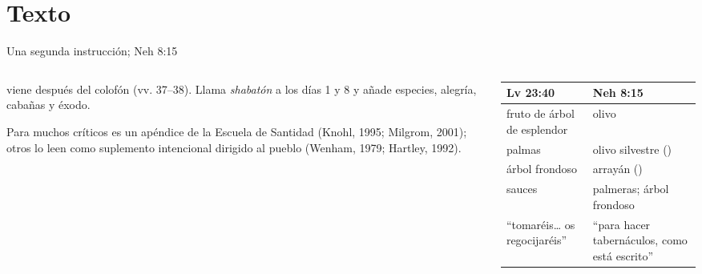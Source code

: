 \section{Texto}

\begin{frame}{Una segunda instrucción; Neh 8:15}
\begin{columns}[t,onlytextwidth]
\begin{column}{0.47\textwidth}\scriptsize
{} viene después del colofón (vv. 37--38). Llama \emph{shabatón} a los días 1 y 8 y añade especies, alegría, cabañas y éxodo.\par\smallskip
Para muchos críticos es un apéndice de la Escuela de Santidad (Knohl, 1995; Milgrom, 2001); otros lo leen como suplemento intencional dirigido al pueblo (Wenham, 1979; Hartley, 1992).
\end{column}
\begin{column}{0.51\textwidth}\scriptsize\renewcommand{\arraystretch}{1.12}
\begin{tabular}{@{}L{2.6cm}L{2.9cm}@{}}
\toprule
\textbf{Lv 23:40} & \textbf{Neh 8:15} \\ \midrule
fruto de árbol de esplendor & olivo \\
palmas & olivo silvestre () \\
árbol frondoso & arrayán () \\
sauces & palmeras; árbol frondoso \\ \midrule
``tomaréis\ldots{} os regocijaréis'' & ``para hacer tabernáculos, como está escrito'' \\
\bottomrule
\end{tabular}
\end{column}
\end{columns}\par\medskip
{}
\end{frame}

